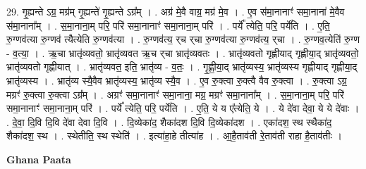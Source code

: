 \documentclass[17pt]{extarticle}
\begin{document}
29. गृ॒ह्यन्ते ऽग्र॒ मग्र॑म् गृ॒ह्यन्ते॑ गृ॒ह्यन्ते ऽग्र᳚म् । . अग्र॑ मे॒वै वाग्र॒ मग्र॑ मे॒व । . ए॒व स॑मा॒नानाꣳ॑ समा॒नाना॑ मे॒वैव स॑मा॒नाना᳚म् । . स॒मा॒नाना॒म् परि॒ परि॑ समा॒नानाꣳ॑ समा॒नाना॒म् परि॑ । . पर्ये᳚ त्येति॒ परि॒ पर्ये॑ति । . ए॒ति॒ रु॒ग्णव॑त्या रु॒ग्णव॑ त्यैत्येति रु॒ग्णव॑त्या । . रु॒ग्णव॑त्य॒ र्‌च र्‌चा रु॒ग्णव॑त्या रु॒ग्णव॑त्य॒ र्‌चा । . रु॒ग्णव॒त्येति॑ रु॒ग्ण - व॒त्या॒ । . ऋ॒चा भ्रातृ॑व्यवतो॒ भ्रातृ॑व्यवत ऋ॒च र्‌चा भ्रातृ॑व्यवतः । . भ्रातृ॑व्यवतो गृह्णीयाद् गृह्णीया॒द् भ्रातृ॑व्यवतो॒ भ्रातृ॑व्यवतो गृह्णीयात् । . भ्रातृ॑व्यवत॒ इति॒ भ्रातृ॑व्य - व॒तः॒ । . गृ॒ह्णी॒या॒द् भ्रातृ॑व्यस्य॒ भ्रातृ॑व्यस्य गृह्णीयाद् गृह्णीया॒द् भ्रातृ॑व्यस्य । . भ्रातृ॑व्य स्यै॒वैव भ्रातृ॑व्यस्य॒ भ्रातृ॑व्य स्यै॒व । . ए॒व रु॒क्त्वा रु॒क्त्वै वैव रु॒क्त्वा । . रु॒क्त्वा ऽग्र॒ मग्रꣳ॑ रु॒क्त्वा रु॒क्त्वा ऽग्र᳚म् । . अग्रꣳ॑ समा॒नानाꣳ॑ समा॒नाना॒ मग्र॒ मग्रꣳ॑ समा॒नाना᳚म् । . स॒मा॒नाना॒म् परि॒ परि॑ समा॒नानाꣳ॑ समा॒नाना॒म् परि॑ । . पर्ये᳚ त्येति॒ परि॒ पर्ये॑ति । . ए॒ति॒ ये य ए᳚त्येति॒ ये । . ये दे॑वा देवा॒ ये ये दे॑वाः । . दे॒वा॒ दि॒वि दि॒वि दे॑वा देवा दि॒वि । . दि॒व्येका॑द॒ शैका॑दश दि॒वि दि॒व्येका॑दश । . एका॑दश॒ स्थ स्थैका॑द॒ शैका॑दश॒ स्थ । . स्थेतीति॒ स्थ स्थेति॑ । . इत्या॑हा॒हे तीत्या॑ह । . आ॒है॒ताव॑ती रे॒ताव॑ती राहा है॒ताव॑तीः । \newline

\textbf{Ghana Paata } \newline
\end{document}
